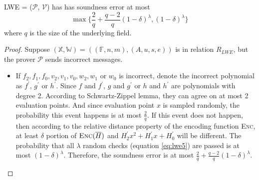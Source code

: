 \begin{lemma}
\label{lemma:lwese}

LWE = ($\mathcal{P}$, $\mathcal{V}$) has has soundness error at most 
$$
    \max\{\frac{2}{q} + \frac{q-2}{q}(1 - \delta)^\lambda, (1 - \delta)^\lambda\}
$$
where $q$ is the size of the underlying field.

\end{lemma}
\begin{proof}

Suppose $(\mathbb{X}, \mathbb{W}) = ((\mathbb{F}, n, m), (A, u, s, e))$ is in relation $R_{LWE}$, but the prover $\mathcal{P}$ sends incorrect messages. 
\begin{itemize}

    
    \item If $f_2, f_1, f_0, v_2, v_1, v_0, w_2, w_1$ or $w_0$ is incorrect, denote the incorrect polynomial as $f^\prime$, $g^\prime$ or $h^\prime$. Since $f$ and $f^\prime$, $g$ and $g^\prime$ or $h$ and $h^\prime$ are polynomials with degree 2. According to Schwartz-Zippel lemma, they can agree on at most 2 evaluation points. And since evaluation point $x$ is sampled randomly, the probability this event happens is at most $\frac{2}{q}$. If this event does not happen, then according to the relative distance property of the encoding function \textsc{Enc}, at least $\delta$ portion of $\textsc{Enc}(\overline{H})$ and $H_2^\prime x^2 + H_1^\prime x + H_0^\prime$ will be different. The probability that all $\lambda$ random checks (equation \ref{eq:lwe5}) are passed is at most $(1 - \delta)^\lambda$. Therefore, the soundness error is at most $\frac{2}{q} + \frac{q-2}{q}(1 - \delta)^\lambda$.


\end{itemize}
\end{proof}
